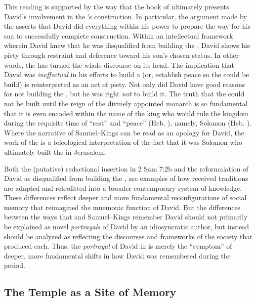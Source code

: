 This reading is supported by the way that the book of \chronicles ultimately presents David's involvement in the \temple's construction. In particular, the argument made by the \chronicler asserts that David did everything within his power to prepare the way for his son to successfully complete construction. Within an intellectual framework wherein David knew that he was disqualified from building the \temple, David shows his piety through restraint and deference toward his son's chosen status. In other words, the \chronicler has turned the whole discourse on its head. The implication that David was \emph{ineffectual} in his efforts to build a \temple (or, establish peace so the \temple could be build) is reinterpreted as an act of piety. Not only did David have good reasons for not building the \temple, but he was right \emph{not} to build it. The truth that the \temple could not be built until the reign of the divinely appointed monarch is so fundamental that it is even encoded within the name of the king who would rule the kingdom during the requisite time of ``rest'' and ``peace'' (Heb. ), namely, Solomon (Heb. ). Where the narrative of Samuel--Kings can be read as an apology for David, the work of the \chronicler is a teleological interpretation of the fact that it was Solomon who ultimately built the \temple in Jerusalem.

Both the (putative) redactional insertion in 2 Sam 7:2b and the reformulation of David as disqualified from building the \temple, are examples of how received traditions are adapted and retrofitted into a broader contemporary system of knowledge. These differences reflect deeper and more fundamental reconfigurations of social memory that reimagined the mnemonic function of David. But the differences between the ways that \chronicles and Samuel--Kings remember David should not primarily be explained as novel \emph{portrayals} of David by an idiosyncratic author, but instead should be analyzed as reflecting the discourses and frameworks of the society that produced each. Thus, the \emph{portrayal} of David in \chronicles is merely the ``symptom'' of deeper, more fundamental shifts in how David was remembered during the \secondtemple period. 

\subsection{The Temple as a Site of Memory}

